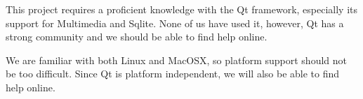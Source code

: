\documentclass[12pt]{article}
\begin{document}
This project requires a proficient knowledge with the Qt framework, especially its support for Multimedia and Sqlite. None of us have used it, however, Qt has a strong community and we should be able to find help online.

We are familiar with both Linux and MacOSX, so platform support should not be too difficult. Since Qt is platform independent, we will also be able to find help online.
\end{document}
